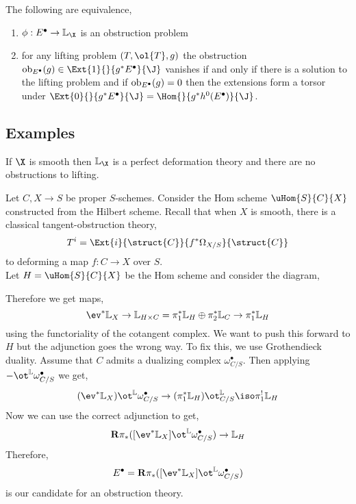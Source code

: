 \documentclass[12pt]{article}
\begin{document}
\begin{theorem}
The following are equivalence,
\begin{enumerate}
\item $\phi : E^\bullet \to \LL_{\X}$ is an obstruction problem

\item for any lifting problem $(T, \ol{T}, g)$ the obstruction $\ob_{E^\bullet}(g) \in \Ext{1}{}{g^* E^\bullet}{\J}$ vanishes if and only if there is a solution to the lifting problem and if $\mathrm{ob}_{E^\bullet}(g) = 0$ then the extensions form a torsor under $\Ext{0}{}{g^* E^\bullet}{\J} = \Hom{}{g^* h^0(E^\bullet)}{\J}$.
\end{enumerate}
\end{theorem}

\subsection{Examples}

\newcommand{\R}{\mathbf{R}}

\begin{example}
If $\X$ is smooth then $\LL_{\X}$ is a perfect deformation theory and there are no obstructions to lifting. 
\end{example}

\begin{example}
Let $C, X \to S$ be proper $S$-schemes. Consider the Hom scheme $\uHom{S}{C}{X}$ constructed from the Hilbert scheme. Recall that when $X$ is smooth, there is a classical tangent-obstruction theory,
\[ T^i = \Ext{i}{\struct{C}}{f^* \Omega_{X/S}}{\struct{C}} \]
to deforming a map $f : C \to X$ over $S$.
\bigskip\\
Let $H = \uHom{S}{C}{X}$ be the Hom scheme and consider the diagram,
\begin{center}
\end{center}
Therefore we get maps,
\[ \ev^* \LL_{X} \to \LL_{H \times C} = \pi_1^* \LL_{H} \oplus \pi_2^* \LL_{C} \to \pi^*_1 \LL_{H} \]
using the functoriality of the cotangent complex. We want to push this forward to $H$ but the adjunction goes the wrong way. To fix this, we use Grothendieck duality. Assume that $C$ admits a dualizing complex $\omega_{C/S}^\bullet$. Then applying $- \ot^{\LL} \omega_{C/S}^\bullet$ we get,
\[ (\ev^* \LL_X) \ot^{\LL} \omega_{C/S}^\bullet \to (\pi_1^* \LL_{H}) \ot^{\LL}_{C/S} \iso \pi_1^! \LL_{H} \]
Now we can use the correct adjunction to get,
\[ \R \pi_* ([\ev^* \LL_{X}] \ot^{\LL} \omega_{C/S}^\bullet) \to \LL_{H} \]
Therefore, 
\[ E^\bullet = \R \pi_* ([\ev^* \LL_{X}] \ot^{\LL} \omega_{C/S}^\bullet) \]
is our candidate for an obstruction theory.
\end{example}
\end{document}
